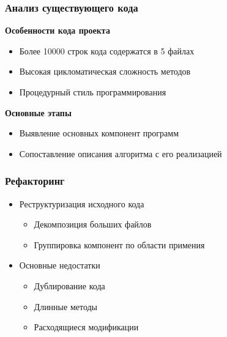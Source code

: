 \documentclass{beamer}
\begin{document}
\begin{frame}\frametitle{Анализ существующего кода}
    \textbf{Особенности кода проекта}
    \begin{itemize}
        \item{Более 10000 строк кода содержатся в 5 файлах}
        \item{Высокая цикломатическая сложность методов}
        \item{Процедурный стиль программирования}
    \end{itemize}
    \vspace{\baselineskip}
    \textbf{Основные этапы}
    \begin{itemize}
        \item{Выявление основных компонент программ}
        \item{Сопоставление описания алгоритма с его реализацией}
    \end{itemize}
\end{frame}



\begin{frame}\frametitle{Рефакторинг}
    \begin{itemize}
        \item{ Реструктуризация исходного кода
            \begin{itemize}
                \item{Декомпозиция больших файлов}
                \item{Группировка компонент по области примения}
            \end{itemize}
        }
        \vspace{\baselineskip}
        \item{Основные недостатки
            \begin{itemize}
                \item{Дублирование кода}
                \item{Длинные методы}
                \item{Расходящиеся модификации}
            \end{itemize}
        }
    \end{itemize}
\end{frame}

\end{document}
